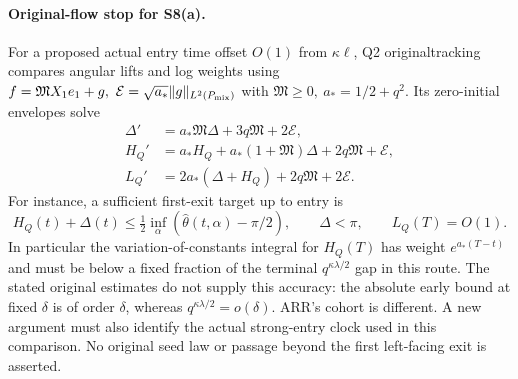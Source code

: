 \documentclass[11pt]{article}
\begin{document}
\paragraph{Original-flow stop for S8(a).}
For a proposed actual entry time offset \(O(1)\) from \(\kappa\ell\),
Q2 originaltracking compares angular lifts and log weights using
\(f=\mathfrak M X_1e_1+g,\ \mathcal E=\sqrt{a_*}\|g\|_{L^2(P_{\rm mix})}\)
with \(\mathfrak M\ge0,\ a_*=1/2+q^2\). Its zero-initial envelopes solve
\begin{align*}
 \Delta'&=a_*\mathfrak M\Delta+3q\mathfrak M+2\mathcal E,\\
 H_Q'&=a_*H_Q+a_*(1+\mathfrak M)\Delta+2q\mathfrak M+\mathcal E,\\
 L_Q'&=2a_*(\Delta+H_Q)+2q\mathfrak M+2\mathcal E .
\end{align*}
For instance, a sufficient first-exit target up to entry is
\[
 H_Q(t)+\Delta(t)\le\tfrac12\inf_{\alpha}
       (\widehat\theta(t,\alpha)-\pi/2),\qquad
 \Delta<\pi,\qquad L_Q(T)=O(1).
\]
In particular the variation-of-constants integral for \(H_Q(T)\)
has weight \(e^{a_*(T-t)}\) and must be below a fixed fraction of
the terminal \(q^{\kappa\lambda/2}\) gap in this route.
The stated original estimates do not supply this accuracy:
the absolute early bound at fixed \(\delta\) is of order \(\delta\),
whereas \(q^{\kappa\lambda/2}=o(\delta)\).
ARR's cohort is different. A new argument must also identify the
actual strong-entry clock used in this comparison. No original seed law
or passage beyond the first left-facing exit is asserted.
\end{document}
